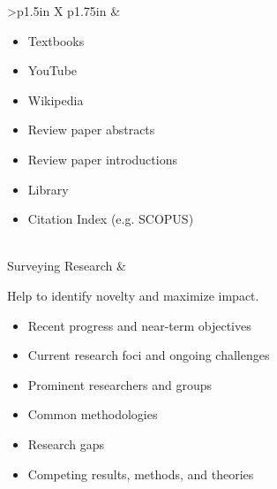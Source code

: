 \documentclass[8pt]{extarticle}
\begin{document}
\begin{tabularx}{\linewidth}{>{\bfseries}p{1.5in} X p{1.75in}}
                                                &   \begin{minipage}[t]{\linewidth}
                                                    \begin{itemize}[nosep,leftmargin=*]
                                                        \item Textbooks
                                                        \item YouTube
                                                        \item Wikipedia
                                                        \item Review paper abstracts
                                                        \item Review paper introductions
                                                    \end{itemize}
                                                    \vspace{0.5em}
                                                    \begin{itemize}[nosep,leftmargin=*]
                                                        \item Library
                                                        \item Citation Index (e.g. SCOPUS)
                                                    \end{itemize}
                                                    \end{minipage}
                                                            \\
    \addlinespace
    Surveying Research          &   \begin{minipage}[t]{\linewidth}
                                    Help to identify novelty and maximize impact.
                                    \begin{itemize}[nosep]
                                        \item Recent progress and near-term objectives
                                        \item Current research foci and ongoing challenges
                                        \item Prominent researchers and groups
                                        \item Common methodologies
                                        \item Research gaps
                                        \item Competing results, methods, and theories
                                    \end{itemize}
                                    \end{minipage}


\end{tabularx}
\end{document}
